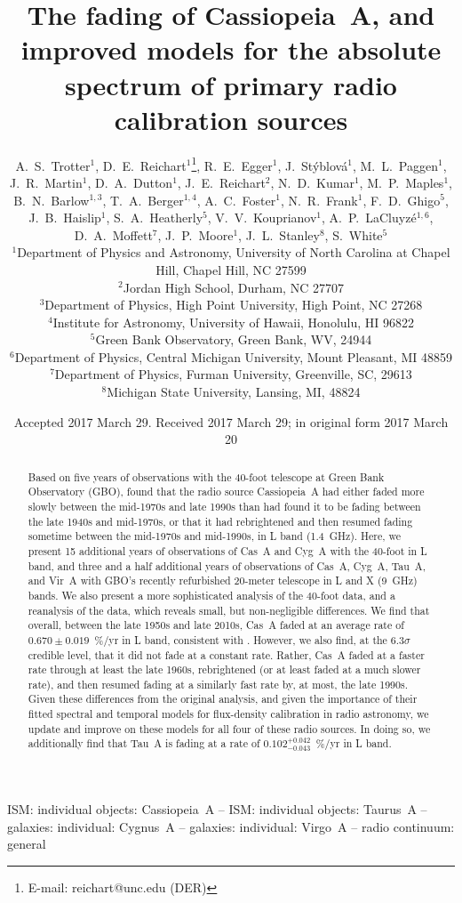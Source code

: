 \documentclass[fleqn,usenatbib]{mnras}
\title[Fading of Cassiopeia A]{The fading of Cassiopeia~A, and improved models for the absolute spectrum of primary radio calibration sources}
\author[Trotter et al.]
{A.~S.~Trotter$^{1}$, 
D.~E.~Reichart$^{1}$\thanks{E-mail: reichart@unc.edu (DER)}, 
R.~E.~Egger$^{1}$, 
J.~St\'{y}blov\'{a}$^{1}$, 
M.~L.~Paggen$^{1}$, \newauthor
J.~R.~Martin$^{1}$, 
D.~A.~Dutton$^{1}$,
J.~E.~Reichart$^{2}$,
N.~D.~Kumar$^{1}$, 
M.~P.~Maples$^{1}$, \newauthor
B.~N.~Barlow$^{1,3}$,
T.~A.~Berger$^{1,4}$, 
A.~C.~Foster$^{1}$, 
N.~R.~Frank$^{1}$,
F.~D.~Ghigo$^{5}$, \newauthor
J.~B.~Haislip$^{1}$, 
S.~A.~Heatherly$^{5}$, 
V.~V.~Kouprianov$^{1}$, 
A.~P.~LaCluyz\'{e}$^{1,6}$,  
D.~A.~Moffett$^{7}$, \newauthor
J.~P.~Moore$^{1}$,
J.~L.~Stanley$^{8}$, 
S.~White$^{5}$
\\
$^{1}$Department of Physics and Astronomy, University of North Carolina at Chapel Hill, Chapel Hill, NC 27599
\\
$^{2}$Jordan High School, Durham, NC 27707
\\
$^{3}$Department of Physics, High Point University, High Point, NC 27268
\\
$^{4}$Institute for Astronomy, University of Hawaii, Honolulu, HI 96822
\\
$^{5}$Green Bank Observatory, Green Bank, WV, 24944
\\
$^{6}$Department of Physics, Central Michigan University, Mount Pleasant, MI 48859
\\
$^{7}$Department of Physics, Furman University, Greenville, SC, 29613
\\
$^{8}$Michigan State University, Lansing, MI, 48824}
\begin{document}
\date{Accepted 2017 March 29. Received 2017 March 29; in original form 2017 March 20}



\maketitle


\begin{abstract}
Based on five years of observations with the 40-foot telescope at Green Bank Observatory (GBO), \citet{r00} found that the radio source Cassiopeia~A had either faded more slowly between the mid-1970s and late 1990s than \citet{b77} had found it to be fading between the late 1940s and mid-1970s, or that it had rebrightened and then resumed fading sometime between the mid-1970s and mid-1990s, in L band (1.4~GHz).  Here, we present 15 additional years of observations of Cas~A and Cyg~A with the 40-foot in L band, and three and a half additional years of observations of Cas~A, Cyg~A, Tau~A, and Vir~A with GBO's recently refurbished 20-meter telescope in L and X (9~GHz) bands.  We also present a more sophisticated analysis of the 40-foot data, and a reanalysis of the \citet{b77} data, which reveals small, but non-negligible differences.  We find that overall, between the late 1950s and late 2010s, Cas~A faded at an average rate of $0.670 \pm 0.019$~\%/yr in L band, consistent with \citet{r00}.  However, we also find, at the 6.3$\sigma$ credible level, that it did not fade at a constant rate.  Rather, Cas~A faded at a faster rate through at least the late 1960s, rebrightened (or at least faded at a much slower rate), and then resumed fading at a similarly fast rate by, at most, the late 1990s.  Given these differences from the original \citet{b77} analysis, and given the importance of their fitted spectral and temporal models for flux-density calibration in radio astronomy, we update and improve on these models for all four of these radio sources.  In doing so, we additionally find that Tau~A is fading at a rate of $0.102^{+0.042}_{-0.043}$~\%/yr in L band.
\end{abstract}

\begin{keywords}
ISM: individual objects: Cassiopeia~A -- ISM: individual objects: Taurus~A -- galaxies: individual: Cygnus~A -- galaxies: individual: Virgo~A -- radio continuum: general
\end{keywords}
\end{document}
